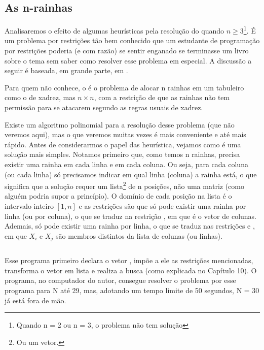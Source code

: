 \documentclass{article}
\begin{document}
\subsection{As n-rainhas}

Analisaremos o efeito de algumas heurísticas pela resolução do  quando $n \geq 3$\footnote{Quando n = 2 ou n = 3, o problema não tem solução}. É um
problema por restrições tão bem conhecido que um estudante de programação por
restrições poderia (e com razão) se sentir enganado se terminasse um livro sobre o tema sem saber
como resolver esse problema em especial. A discussão a seguir é baseada, em grande parte, em
\cite{krzysztof}.

Para quem não conhece, o  é o problema de alocar n rainhas em um
tabuleiro como o de xadrez, mas $n\times n$, com a restrição de que as rainhas não tem permissão
para se atacarem segundo as regras usuais de xadrez.

Existe um algoritmo polinomial para a resolução desse problema (que não veremos aqui), mas o que
veremos muitas vezes é mais conveniente e até mais rápido. Antes de considerarmos o papel das
heurística, vejamos como é uma solução mais simples. Notamos primeiro que, como temos n rainhas,
precisa existir uma rainha em cada linha e em cada coluna. Ou seja, para cada coluna (ou cada linha)
só precisamos indicar em qual linha (coluna) a rainha está, o que significa que a solução requer um
lista\footnote{Ou um vetor.} de n posições, não uma matriz (como alguém podria supor a princípio). O domínio de cada
posição na lista é o intervalo inteiro $[1,n]$ e as restrições são que só pode existir uma rainha
por linha (ou por coluna), o que se traduz na restrição , em que
 é o vetor de colunas. Ademais, só pode existir uma rainha por linha, o que se traduz nas
restrições  e , em que $X_i$ e $X_j$ são membros distintos da lista de colunas (ou linhas).

    \inputminted{prolog}{../Exemplos/Cap11/prog1_queens.ecl}

Esse programa primeiro declara o vetor , impõe a ele as restrições mencionadas,
transforma o vetor em lista e realiza a busca (como explicada no Capítulo 10).%
O programa, no computador do autor, consegue resolver o problema por esse programa para N até 29,
mas, adotando um tempo limite de 50 segundos, N = 30 já está fora de mão.
\end{document}
